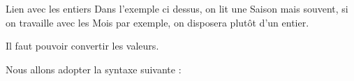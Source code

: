 \begin{frame}{Lien avec les entiers}
	Dans l'exemple ci dessus, on lit une Saison mais souvent,
	si on travaille avec les Mois par exemple,
	on disposera plutôt d'un entier. 
	
	Il faut pouvoir	convertir les valeurs. 
	
	Nous allons adopter la syntaxe suivante :

	\bigskip
	
\end{frame}
